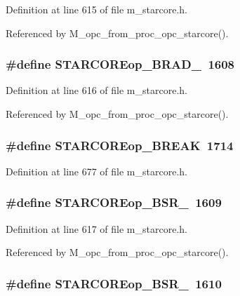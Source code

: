 Definition at line 615 of file m\_\-starcore.h.

Referenced by M\_\-opc\_\-from\_\-proc\_\-opc\_\-starcore().
\subsubsection{\setlength{\rightskip}{0pt plus 5cm}\#define STARCOREop\_\-BRAD\_~1608}\label{m__starcore_8h_b45157c1d60eb6f2a44f037062f6618d}




Definition at line 616 of file m\_\-starcore.h.

Referenced by M\_\-opc\_\-from\_\-proc\_\-opc\_\-starcore().
\subsubsection{\setlength{\rightskip}{0pt plus 5cm}\#define STARCOREop\_\-BREAK~1714}\label{m__starcore_8h_15b2900c072dd8e70c747960ee7a7967}




Definition at line 677 of file m\_\-starcore.h.
\subsubsection{\setlength{\rightskip}{0pt plus 5cm}\#define STARCOREop\_\-BSR\_~1609}\label{m__starcore_8h_79e2ab1124f7824d5adb30da542dc3df}




Definition at line 617 of file m\_\-starcore.h.

Referenced by M\_\-opc\_\-from\_\-proc\_\-opc\_\-starcore().
\subsubsection{\setlength{\rightskip}{0pt plus 5cm}\#define STARCOREop\_\-BSR\_~1610}\label{m__starcore_8h_981f8fb3f51732d68e845174bdfe6db8}




